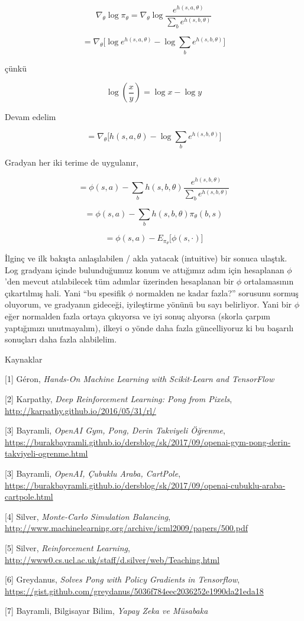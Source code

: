 \documentclass[12pt,fleqn]{article}\usepackage{../../common}
\begin{document}
$$ 
\nabla_\theta \log \pi_\theta = 
\nabla_\theta \log \frac{e^{h(s,a,\theta)}}{\sum_b e^{h(s,b,\theta)} }
$$

$$ = \nabla_\theta \big[ \log e^{h(s,a,\theta)} - \log \sum_b e^{h(s,b,\theta)}\big]$$

çünkü 

$$ \log(\frac{x}{y}) = \log x - \log y $$

Devam edelim

$$ = \nabla_\theta \big[ h(s,a,\theta) - \log \sum_b e^{h(s,b,\theta)} \big]$$

Gradyan her iki terime de uygulanır,

$$ 
= \phi(s,a) - \sum_b h(s,b,\theta)\frac{e^{h(s,b,\theta)}}{\sum_b e^{h(s,b,\theta)}} 
$$

$$ 
= \phi(s,a) - \sum_b h(s,b,\theta) \pi_\theta(b,s)
$$

$$ 
= \phi(s,a) - E_{\pi_\theta} \big[ \phi(s,\cdot) \big]
$$

İlginç ve ilk bakışta anlaşılabilen / akla yatacak (intuitive) bir sonuca
ulaştık. Log gradyanı içinde bulunduğumuz konum ve attığımız adım için
hesaplanan $\phi$'den mevcut atılabilecek tüm adımlar üzerinden hesaplanan
bir $\phi$ ortalamasının çıkartılmış hali. Yani ``bu spesifik $\phi$
normalden ne kadar fazla?'' sorusunu sormuş oluyorum, ve gradyanın gideceği,
iyileştirme yönünü bu sayı belirliyor. Yani bir $\phi$ eğer normalden fazla
ortaya çıkıyorsa ve iyi sonuç alıyorsa (skorla çarpım yaptığımızı
unutmayalım), ilkeyi o yönde daha fazla güncelliyoruz ki bu başarılı
sonuçları daha fazla alabilelim.

Kaynaklar

[1] Géron, {\em Hands-On Machine Learning with Scikit-Learn and TensorFlow}

[2] Karpathy, {\em Deep Reinforcement Learning: Pong from Pixels}, 
    \url{http://karpathy.github.io/2016/05/31/rl/}

[3] Bayramli, {\em OpenAI Gym, Pong, Derin Takviyeli Öğrenme},
    \url{https://burakbayramli.github.io/dersblog/sk/2017/09/openai-gym-pong-derin-takviyeli-ogrenme.html}

[3] Bayramli, {\em OpenAI, Çubuklu Araba, CartPole},
   \url{https://burakbayramli.github.io/dersblog/sk/2017/09/openai-cubuklu-araba-cartpole.html}

[4] Silver, {\em Monte-Carlo Simulation Balancing},
    \url{http://www.machinelearning.org/archive/icml2009/papers/500.pdf}

[5] Silver, {\em Reinforcement Learning}, 
    \url{http://www0.cs.ucl.ac.uk/staff/d.silver/web/Teaching.html}

[6] Greydanus, {\em Solves Pong with Policy Gradients in Tensorflow}, 
    \url{https://gist.github.com/greydanus/5036f784eec2036252e1990da21eda18}

[7] Bayramli, Bilgisayar Bilim, {\em Yapay Zeka ve Müsabaka}
\end{document}
